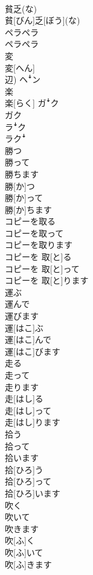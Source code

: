 \documentclass[8pt]{extreport}
\begin{document}
\begin{CJK}{UTF8}{min}
\\	貧乏(な)	
\\	貧[びん]乏[ぼう](な)	
\\	ペラペラ	
\\	ペラペラ	
\\	変	
\\	変[へん] 
\\	辺)	ヘꜜン
\\	楽	
\\	楽[らく]	ガꜜク 
\\	ガク 
\\	ラꜜク 
\\	ラクꜜ
\\	勝つ 
\\	勝って 
\\	勝ちます	
\\	勝[か]つ 
\\	勝[か]って 
\\	勝[か]ちます	
\\	コピーを取る 
\\	コピーを取って 
\\	コピーを取ります	
\\	コピーを 取[と]る 
\\	コピーを 取[と]って 
\\	コピーを 取[と]ります	
\\	運ぶ 
\\	運んで 
\\	運びます	
\\	運[はこ]ぶ 
\\	運[はこ]んで 
\\	運[はこ]びます	
\\	走る 
\\	走って 
\\	走ります	
\\	走[はし]る 
\\	走[はし]って 
\\	走[はし]ります	
\\	拾う 
\\	拾って 
\\	拾います	
\\	拾[ひろ]う 
\\	拾[ひろ]って 
\\	拾[ひろ]います	
\\	吹く 
\\	吹いて 
\\	吹きます	
\\	吹[ふ]く 
\\	吹[ふ]いて 
\\	吹[ふ]きます	

\end{CJK}
\end{document}
